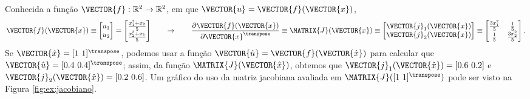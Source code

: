 \begin{example}
Conhecida a função $\VECTOR{f}: \mathbb{R}^2 \rightarrow \mathbb{R}^2$,
em que $\VECTOR{u}=\VECTOR{f}(\VECTOR{x})$, 
\begin{equation}
\VECTOR{f}(\VECTOR{x})\equiv 
\begin{bmatrix}
u_1\\
u_2
\end{bmatrix}
=
\begin{bmatrix}
\frac{x_1^3+x_2}{5}\\
\frac{x_2^3+x_1}{5}
\end{bmatrix}
\qquad \rightarrow \qquad
\frac{\partial \VECTOR{f}(\VECTOR{x}) }{\partial \VECTOR{x}^{\transpose}}\equiv
\MATRIX{J}(\VECTOR{x})\equiv
\begin{bmatrix}
\VECTOR{j}_{1}(\VECTOR{x})\\
\VECTOR{j}_{2}(\VECTOR{x})
\end{bmatrix}\equiv
\begin{bmatrix}
\frac{3 x_1^2}{5} & \frac{1}{5}\\
\frac{1}{5}       & \frac{3 x_2^2}{5}
\end{bmatrix}.
\end{equation}
Se $\VECTOR{\hat{x}}=[1~ 1]^{\transpose}$, podemos usar a função $\VECTOR{\hat{u}}=\VECTOR{f}(\VECTOR{\hat{x}})$ 
para calcular que $\VECTOR{\hat{u}}=[0.4~ 0.4]^{\transpose}$;
assim, da função $\MATRIX{J}(\VECTOR{\hat{x}})$, obtemos que 
$\VECTOR{j}_{1}(\VECTOR{\hat{x}})=[0.6~ 0.2]$ e $\VECTOR{j}_{2}(\VECTOR{\hat{x}})=[0.2~ 0.6]$.
Um gráfico do uso da matriz jacobiana avaliada em $\MATRIX{J}([1~ 1]^{\transpose})$ 
pode ser visto na Figura \ref{fig:ex:jacobiano}.
\end{example}
